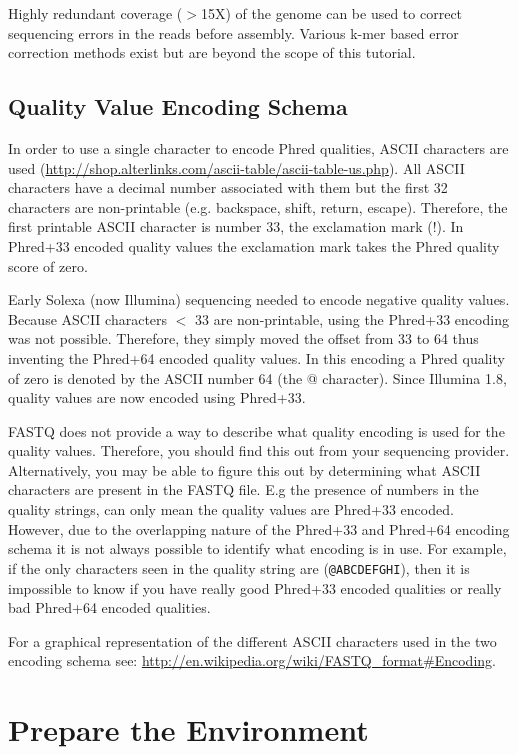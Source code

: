 Highly redundant coverage ($>$15X) of the genome can be used to correct sequencing
errors in the reads before assembly. Various k-mer based error
correction methods exist but are beyond the scope of this tutorial.

\subsection{Quality Value Encoding Schema}

In order to use a single character to encode Phred qualities, ASCII characters
are used (\url{http://shop.alterlinks.com/ascii-table/ascii-table-us.php}). All ASCII characters have a decimal
number associated with them but the first 32 characters are non-printable (e.g.
backspace, shift, return, escape). Therefore, the first printable ASCII   
character is number 33, the exclamation mark (!). In Phred+33 encoded quality
values the exclamation mark takes the Phred quality score of zero.

Early Solexa (now Illumina) sequencing needed to encode negative quality values.
Because ASCII characters $<$ 33 are non-printable, using the Phred+33 encoding was
not possible. Therefore, they simply moved the offset from 33 to 64 thus
inventing the Phred+64 encoded quality values. In this encoding a Phred quality
of zero is denoted by the ASCII number 64 (the @ character). Since Illumina 1.8,
quality values are now encoded using Phred+33.

FASTQ does not provide a way to describe what quality encoding is used for the
quality values. Therefore, you should find this out from your sequencing
provider. Alternatively, you may be able to figure this out by determining what
ASCII characters are present in the FASTQ file. E.g the presence of numbers in
the quality strings, can only mean the quality values are Phred+33 encoded.
However, due to the overlapping nature of the Phred+33 and Phred+64 encoding
schema it is not always possible to identify what encoding is in use. For
example, if the only characters seen in the quality string are (\texttt{@ABCDEFGHI}),
then it is impossible to know if you have really good Phred+33 encoded qualities
or really bad Phred+64 encoded qualities.

For a graphical representation of the different ASCII characters used in the two
encoding schema see: \url{http://en.wikipedia.org/wiki/FASTQ_format#Encoding}.

\section{Prepare the Environment}


